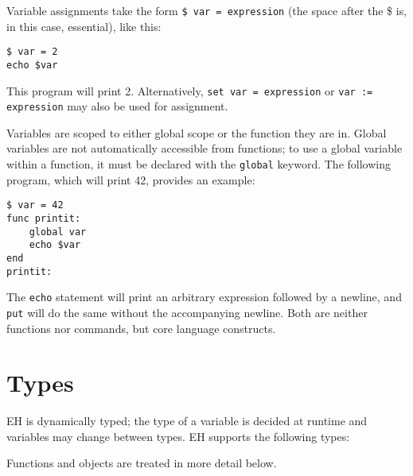 \documentclass{article}
\begin{document}
Variable assignments take the form \verb#$ var = expression# (the space after the \$ is, in this case, essential), like this:
\begin{verbatim}
$ var = 2
echo $var
\end{verbatim}
This program will print 2. Alternatively, \verb#set var = expression# or \verb#var := expression# may also be used for assignment.

Variables are scoped to either global scope or the function they are in. Global variables are not automatically accessible from functions; to use a global variable within a function, it must be declared with the \verb#global# keyword. The following program, which will print 42, provides an example:
\begin{verbatim}
$ var = 42
func printit:
	global var
	echo $var
end
printit:
\end{verbatim}

The \verb#echo# statement will print an arbitrary expression followed by a newline, and \verb#put# will do the same without the accompanying newline. Both are neither functions nor commands, but core language constructs.

\section{Types}
EH is dynamically typed; the type of a variable is decided at runtime and variables may change between types. EH supports the following types:
Functions and objects are treated in more detail below.
\end{document}
